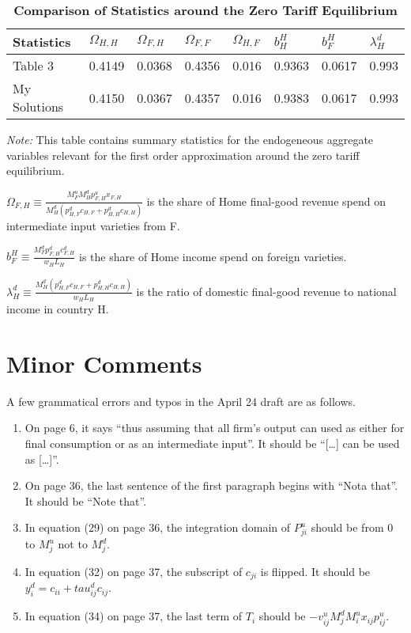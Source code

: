 \documentclass{homeworg}
\begin{document}
\begin{table}[H]
\centering
\caption{\textbf{Comparison of Statistics around the Zero Tariff Equilibrium}}
\label{tab:stats_compar}
\begin{tabular}{llllllll}
\hline\hline
Statistics   & $\Omega_{H, H}$ & $\Omega_{F, H}$ & $\Omega_{F, F}$ & $\Omega_{H, F}$ & $b^{H}_{H}$ & $b^{H}_{F}$ & $\lambda^{d}_{H}$ \\
\hline
Table 3 & 0.4149 & 0.0368 & 0.4356 & 0.016 & 0.9363 & 0.0617 & 0.993 \\
My Solutions & 0.4150 & 0.0367 & 0.4357 & 0.016 & 0.9383 & 0.0617 & 0.993 \\
\hline\hline
\end{tabular}
\begin{flushleft}
\scriptsize{\textit{Note:} This table contains summary statistics for the endogeneous aggregate variables relevant for the first order approximation around the zero tariff equilibrium. 

$\Omega_{F, H}\equiv\frac{M^{u}_{F}M^{d}_{H}p^{u}_{F, H}x_{F, H}}{M^{d}_{H}(p^{d}_{H,F}c_{H,F}+p^{d}_{H,H}c_{H,H})}$ is the share of Home final-good revenue spend on intermediate input varieties from F. 

$b^{H}_{F}\equiv\frac{M^{d}_{F}p^{d}_{F,H}c^{d}_{F,H}}{w_{H}L_{H}}$ is the share of Home income spend on foreign varieties. 

$\lambda^{d}_{H}\equiv\frac{M^{d}_{H}(p^{d}_{H,F}c_{H,F}+p^{d}_{H,H}c_{H,H})}{w_{H}L_{H}}$ is the ratio of domestic final-good revenue to national income in country H.}
\end{flushleft}
\end{table}

\section{Minor Comments}

A few grammatical errors and typos in the April 24 draft are as follows.

\begin{enumerate}[ref=Step \arabic{enumi}, wide=0pt]

\item On page 6, it says “thus assuming that all firm’s output can used as either for final consumption or as an intermediate input”. It should be “[…] can be used as […]”.

\item On page 36, the last sentence of the first paragraph begins with “Nota that”. It should be “Note that”.

\item In equation (29) on page 36, the integration domain of $P^{u}_{ji}$ should be from $0$ to $M^{u}_{j}$ not to $M^{d}_{j}$.

\item In equation (32) on page 37, the subscript of $c_{ji}$ is flipped. It should be $y^{d}_{i} = c_{ii} + tau^{d}_{ij}c_{ij}$.

\item In equation (34) on page 37, the last term of $T_{i}$ should be $-v^{u}_{ij}M^{d}_{j}M^{u}_{i}x_{ij}p^{u}_{ij}$.

\end{enumerate}
\end{document}
